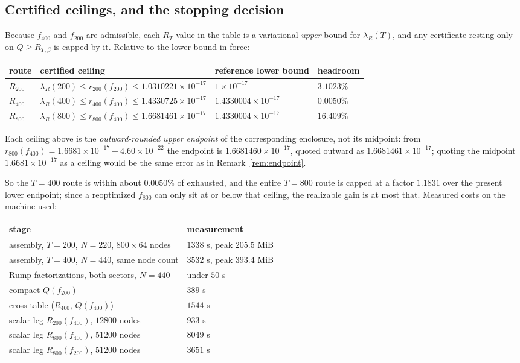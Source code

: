\documentclass[11pt,a4paper]{article}
\theoremstyle{definition}
\theoremstyle{remark}
\newcommand{\lR}{\lambda_{R}}
\begin{document}
\subsection{Certified ceilings, and the stopping decision}

Because $f_{400}$ and $f_{200}$ are admissible, each $R_T$ value in the table is
a variational \emph{upper} bound for $\lR(T)$, and any certificate resting only
on $Q \ge R_{T,\beta}$ is capped by it. Relative to the lower bound in force:
\begin{center}
\begin{tabular}{llll}
\toprule
route & certified ceiling & reference lower bound & headroom \\
\midrule
$R_{200}$ & $\lR(200) \le r_{200}(f_{200}) \le 1.0310221\times10^{-17}$ & $1\times10^{-17}$ & $3.1023\%$ \\
$R_{400}$ & $\lR(400) \le r_{400}(f_{400}) \le 1.4330725\times10^{-17}$ & $1.4330004\times10^{-17}$ & $0.0050\%$ \\
$R_{800}$ & $\lR(800) \le r_{800}(f_{400}) \le 1.6681461\times10^{-17}$ & $1.4330004\times10^{-17}$ & $16.409\%$ \\
\bottomrule
\end{tabular}
\end{center}

Each ceiling above is the \emph{outward-rounded upper endpoint} of the
corresponding enclosure, not its midpoint: from
$r_{800}(f_{400}) = 1.6681\times10^{-17} \pm 4.60\times10^{-22}$ the endpoint is
$1.6681460\times10^{-17}$, quoted outward as $1.6681461\times10^{-17}$; quoting
the midpoint $1.6681\times10^{-17}$ as a ceiling would be the same error as in
Remark~\ref{rem:endpoint}.

So the $T = 400$ route is within about $0.0050\%$ of exhausted, and the entire
$T = 800$ route is capped at a factor $1.1831$ over the present lower endpoint;
since a reoptimized $f_{800}$ can only sit at or below that ceiling, the
realizable gain is at most that. Measured costs on the machine used:

\begin{center}
\begin{tabular}{ll}
\toprule
stage & measurement \\
\midrule
assembly, $T=200$, $N=220$, $800\times64$ nodes & $1338$ s, peak $205.5$ MiB \\
assembly, $T=400$, $N=440$, same node count    & $3532$ s, peak $393.4$ MiB \\
Rump factorizations, both sectors, $N=440$     & under $50$ s \\
compact $Q(f_{200})$                           & $389$ s \\
cross table ($R_{400}$, $Q(f_{400})$)          & $1544$ s \\
scalar leg $R_{200}(f_{400})$, $12800$ nodes   & $933$ s \\
scalar leg $R_{800}(f_{400})$, $51200$ nodes   & $8049$ s \\
scalar leg $R_{800}(f_{200})$, $51200$ nodes   & $3651$ s \\
\bottomrule
\end{tabular}
\end{center}
\end{document}
